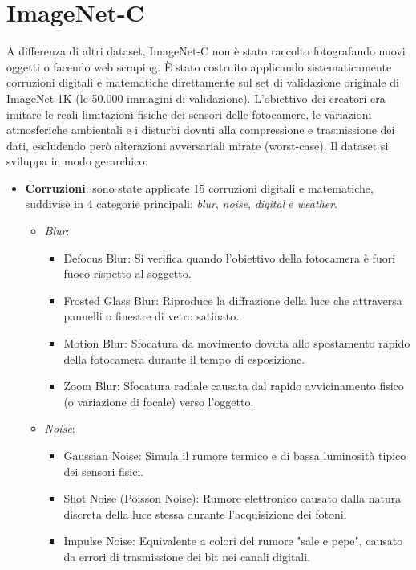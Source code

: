 \section{ImageNet-C}
A differenza di altri dataset, ImageNet-C non è stato raccolto fotografando nuovi oggetti o facendo web scraping. È stato costruito applicando sistematicamente corruzioni digitali e matematiche direttamente sul set di validazione originale di ImageNet-1K (le 50.000 immagini di validazione).
L'obiettivo dei creatori era imitare le reali limitazioni fisiche dei sensori delle fotocamere, le variazioni atmosferiche ambientali e i disturbi dovuti alla compressione e trasmissione dei dati, escludendo però alterazioni avversariali mirate (worst-case)\cite{hendrycks_benchmarking_2019}.
Il dataset si sviluppa in modo gerarchico:
\begin{itemize}
	\item \textbf{Corruzioni}: sono state applicate 15 corruzioni digitali e matematiche, suddivise in 4 categorie principali: \textit{blur}, \textit{noise}, \textit{digital} e \textit{weather}. 
	\begin{itemize}
		\item \textit{Blur}: 
		\begin{itemize} 
			\item Defocus Blur: Si verifica quando l'obiettivo della fotocamera è fuori fuoco rispetto al soggetto.
			\item Frosted Glass Blur: Riproduce la diffrazione della luce che attraversa pannelli o finestre di vetro satinato.
			\item Motion Blur: Sfocatura da movimento dovuta allo spostamento rapido della fotocamera durante il tempo di esposizione.
			\item Zoom Blur: Sfocatura radiale causata dal rapido avvicinamento fisico (o variazione di focale) verso l'oggetto.
		\end{itemize}
		\item \textit{Noise}: 
		\begin{itemize}
			\item Gaussian Noise: Simula il rumore termico e di bassa luminosità tipico dei sensori fisici.
			\item Shot Noise (Poisson Noise): Rumore elettronico causato dalla natura discreta della luce stessa durante l'acquisizione dei fotoni.
			\item Impulse Noise: Equivalente a colori del rumore "sale e pepe", causato da errori di trasmissione dei bit nei canali digitali.
		\end{itemize}

\end{itemize}
\end{itemize}
